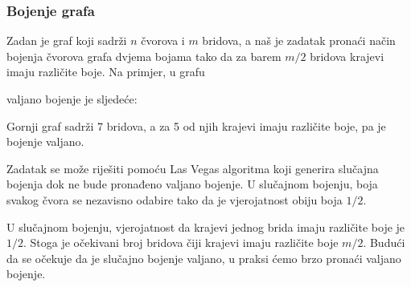 \subsubsection{Bojenje grafa}


Zadan je graf koji sadrži $n$ čvorova i $m$ bridova,
a naš je zadatak pronaći način bojenja čvorova
grafa dvjema bojama tako da
za barem $m/2$ bridova krajevi
imaju različite boje.
Na primjer, u grafu
\begin{center}
\end{center}
valjano bojenje je sljedeće:
\begin{center}
\end{center}
Gornji graf sadrži 7 bridova, a za 5 od njih
krajevi imaju različite boje,
pa je bojenje valjano.

Zadatak se može riješiti pomoću Las Vegas algoritma
koji generira slučajna bojenja dok ne bude pronađeno
valjano bojenje.
U slučajnom bojenju, boja svakog čvora se
nezavisno odabire tako da je vjerojatnost
obiju boja $1/2$.

U slučajnom bojenju, vjerojatnost da krajevi
jednog brida imaju različite boje je $1/2$.
Stoga je očekivani broj bridova čiji krajevi
imaju različite boje $m/2$.
Budući da se očekuje da je slučajno bojenje valjano,
u praksi ćemo brzo pronaći valjano bojenje.
